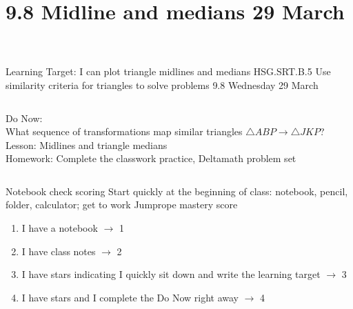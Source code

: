 \documentclass[onlytextwidth, aspectratio=169]{beamer}
\begin{document}
\section{9.8 Midline and medians \hfill 29 March \,}
\begin{frame}{Learning Target: I can plot triangle midlines and medians}
  {HSG.SRT.B.5 Use similarity criteria for triangles to solve problems \hfill \alert{9.8 Wednesday 29 March}}
  \begin{columns}
    Do Now:\\
    What sequence of transformations map similar triangles $\triangle ABP \rightarrow \triangle JKP$? \\[0.5cm]
    Lesson: Midlines and triangle medians \\[0.5cm]
    Homework: Complete the classwork practice, Deltamath problem set \\[0.5cm]
    \begin{flushright}
    \end{flushright}
  \end{columns}
\end{frame}

\begin{frame}{Notebook check scoring}
  {Start quickly at the beginning of class: notebook, pencil, folder, calculator; get to work}
    Jumprope mastery score
    \begin{enumerate}
      \item I have a notebook $\rightarrow$ 1
      \item I have class notes $\rightarrow$ 2
      \item I have stars indicating I quickly sit down and write the learning target $\rightarrow$ 3
      \item I have stars and I complete the Do Now right away $\rightarrow$ 4
    \end{enumerate} \bigskip
\end{frame}
\end{document}
